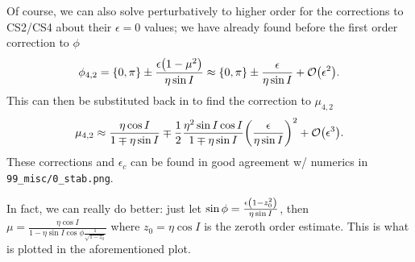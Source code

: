\documentclass[11pt,
        usenames, %
        dvipsnames %
    ]{article}
\DeclarePairedDelimiter\p{\lparen}{\rparen}
\DeclarePairedDelimiter\z{\lbrace}{\rbrace}
\begin{document}
Of course, we can also solve perturbatively to higher order for the corrections
to CS2/CS4 about their $\epsilon = 0$ values; we have already found before the
first order correction to $\phi$
\begin{equation}
    \phi_{4, 2} = \z*{0, \pi} \pm \frac{\epsilon\p*{1 - \mu^2}}{\eta \sin I}
        \approx \z*{0, \pi} \pm \frac{\epsilon}{\eta \sin I} +
        \mathcal{O}\p*{\epsilon^2}.
\end{equation}
This can then be substituted back in to find the correction to $\mu_{4, 2}$
\begin{equation}
    \mu_{4, 2} \approx \frac{\eta \cos I}{1 \mp \eta \sin I}
        \mp \frac{1}{2}\frac{\eta^2 \sin I \cos I}{1 \mp \eta \sin I}
            \p*{\frac{\epsilon}{\eta \sin I}}^2 + \mathcal{O}\p*{\epsilon^3}.
\end{equation}
These corrections and $\epsilon_c$ can be found in good agreement w/ numerics in
\lstinline{99_misc/0_stab.png}.

In fact, we can really do better: just let $\sin \phi = \frac{\epsilon\p*{1 -
z_0^2}}{\eta \sin I}$, then $\mu = \frac{\eta \cos I}{1 - \eta \sin I \cos \phi
\frac{1}{\sqrt{1 - z_0}}}$ where $z_0 = \eta \cos I$ is the zeroth order
estimate. This is what is plotted in the aforementioned plot.
\end{document}
